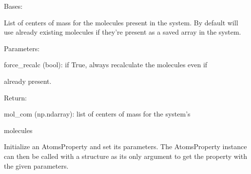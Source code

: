 \documentclass[letterpaper,10pt,english]{sphinxmanual}
\begin{document}

\begin{fulllineitems}
\label{doctree/soprano.properties.linkage.linkage:soprano.properties.linkage.linkage.MoleculeCOM}
Bases: {\hyperref[doctree/soprano.properties.atomsproperty:soprano.properties.atomsproperty.AtomsProperty]{}}

List of centers of mass for the molecules present in the system. By
default will use already existing molecules if they're present as a saved
array in the system.

\begin{DUlineblock}{0em}
\item[] Parameters:
\item[]
\begin{DUlineblock}{\DUlineblockindent}
\item[] force\_recalc (bool): if True, always recalculate the molecules even if
\item[]
\begin{DUlineblock}{\DUlineblockindent}
\item[] already present.
\end{DUlineblock}
\end{DUlineblock}
\end{DUlineblock}

\begin{DUlineblock}{0em}
\item[] Return:
\item[]
\begin{DUlineblock}{\DUlineblockindent}
\item[] mol\_com (np.ndarray): list of centers of mass for the system's
\item[]
\begin{DUlineblock}{\DUlineblockindent}
\item[] molecules
\end{DUlineblock}
\end{DUlineblock}
\end{DUlineblock}

Initialize an AtomsProperty and set its parameters.
The AtomsProperty instance can then be called with a structure as its
only argument to get the property with the given parameters.


\end{fulllineitems}
\end{document}
